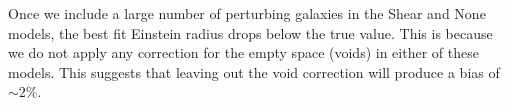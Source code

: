 Once we include a large number of perturbing galaxies in the Shear and None models, the best fit Einstein radius drops below the true value. This is because we do not apply any correction for the empty space (voids) in either of these models. This suggests that leaving out the void correction will produce a bias of $\sim 2\%$.
  